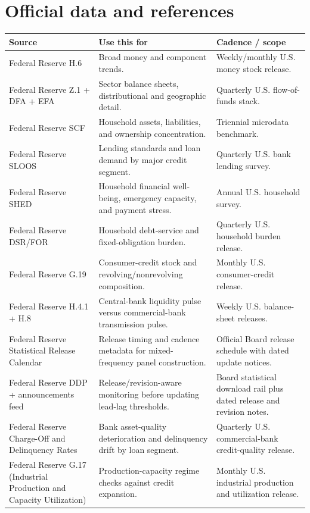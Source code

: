 \documentclass[11pt,openany]{book}
\begin{document}
\section{Official data and references}

\begin{longtable}{>{\raggedright\arraybackslash}p{}p{}p{}}
\toprule
\textbf{Source} & \textbf{Use this for} & \textbf{Cadence / scope} \\
\midrule
\endhead
Federal Reserve H.6 & Broad money and component trends. & Weekly/monthly U.S. money stock release. \\
Federal Reserve Z.1 + DFA + EFA & Sector balance sheets, distributional and geographic detail. & Quarterly U.S. flow-of-funds stack. \\
Federal Reserve SCF & Household assets, liabilities, and ownership concentration. & Triennial microdata benchmark. \\
Federal Reserve SLOOS & Lending standards and loan demand by major credit segment. & Quarterly U.S. bank lending survey. \\
Federal Reserve SHED & Household financial well-being, emergency capacity, and payment stress. & Annual U.S. household survey. \\
Federal Reserve DSR/FOR & Household debt-service and fixed-obligation burden. & Quarterly U.S. household burden release. \\
Federal Reserve G.19 & Consumer-credit stock and revolving/nonrevolving composition. & Monthly U.S. consumer-credit release. \\
Federal Reserve H.4.1 + H.8 & Central-bank liquidity pulse versus commercial-bank transmission pulse. & Weekly U.S. balance-sheet releases. \\
Federal Reserve Statistical Release Calendar & Release timing and cadence metadata for mixed-frequency panel construction. & Official Board release schedule with dated update notices. \\
Federal Reserve DDP + announcements feed & Release/revision-aware monitoring before updating lead-lag thresholds. & Board statistical download rail plus dated release and revision notes. \\
Federal Reserve Charge-Off and Delinquency Rates & Bank asset-quality deterioration and delinquency drift by loan segment. & Quarterly U.S. commercial-bank credit-quality release. \\
Federal Reserve G.17 (Industrial Production and Capacity Utilization) & Production-capacity regime checks against credit expansion. & Monthly U.S. industrial production and utilization release. \\

\end{longtable}
\end{document}
